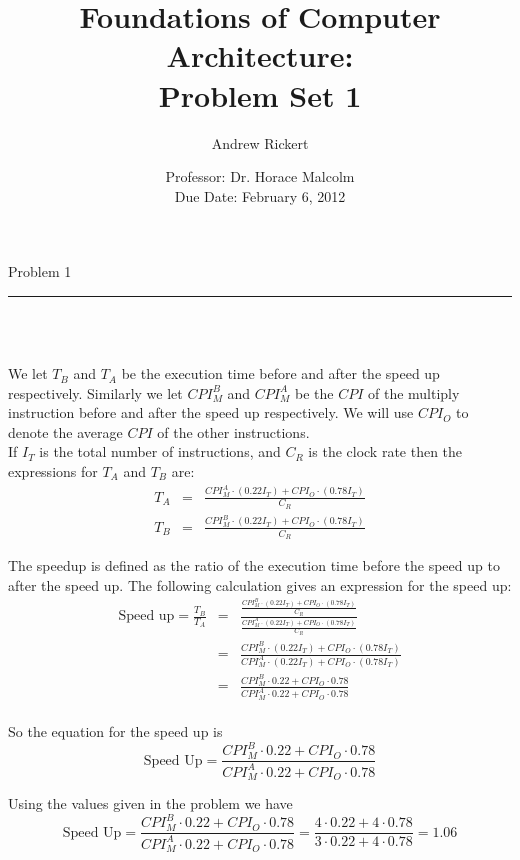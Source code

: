 \documentclass[11pt,reqno]{article}
\title{Foundations of Computer Architecture: \\ Problem Set 1 }
\author{Andrew Rickert}
\date{Professor: Dr. Horace Malcolm \\ \hspace{-25pt} Due Date: February 6,  2012}                                           %
\begin{document}
\maketitle


\begin{flushleft} 
Problem 1 \\
\rule{500pt}{1pt}\\
\end{flushleft} 
\\ 

We let $T_B$ and $T_A$ be the execution time before and after the speed up respectively. Similarly we let $CPI^B_M$ and $CPI^A_M$ be the $CPI$ of the multiply instruction before and after the speed up respectively. We will use $CPI_O$ to denote the average $CPI$ of the other instructions. \\
If $I_T$ is the total number of instructions, and $C_R$ is the clock rate then the expressions for $T_A$ and $T_B$ are:
\begin{eqnarray*}
T_A &=& \frac{CPI^A_M \cdot(0.22 I_T) + CPI_O \cdot (0.78 I_T)}{C_R} \\
T_B &=& \frac{CPI^B_M \cdot(0.22 I_T) + CPI_O \cdot (0.78 I_T)}{C_R}
\end{eqnarray*}

The speedup is defined as the ratio of the execution time before the speed up to after the speed up. The following calculation gives an expression for the speed up:
\begin{eqnarray*}
\text{Speed up} = \frac{T_B}{T_A} &=&  \frac{\frac{CPI^B_M \cdot(0.22 I_T) + CPI_O \cdot (0.78 I_T)}{C_R}}{\frac{CPI^A_M \cdot(0.22 I_T) + CPI_O \cdot (0.78 I_T)}{C_R}} \\
&=& \frac{CPI^B_M \cdot(0.22 I_T) + CPI_O \cdot (0.78 I_T)}{CPI^A_M \cdot(0.22 I_T) + CPI_O \cdot (0.78 I_T)} \\
&=& \frac{CPI^B_M \cdot 0.22 + CPI_O \cdot 0.78}{CPI^A_M \cdot 0.22 + CPI_O \cdot 0.78}
\end{eqnarray*} \\

So the equation for the speed up is 
\begin{equation}
\text{Speed Up} =  \frac{CPI^B_M \cdot 0.22 + CPI_O \cdot 0.78}{CPI^A_M \cdot 0.22 + CPI_O \cdot 0.78} \label{eqn:speedup}
\end{equation}

Using the values given in the problem we have 
\[ \text{Speed Up} =  \frac{CPI^B_M \cdot 0.22 + CPI_O \cdot 0.78}{CPI^A_M \cdot 0.22 + CPI_O \cdot 0.78} =  \frac{4 \cdot 0.22 + 4 \cdot 0.78}{3 \cdot 0.22 + 4 \cdot 0.78} = 1.06 \]
\end{document}
